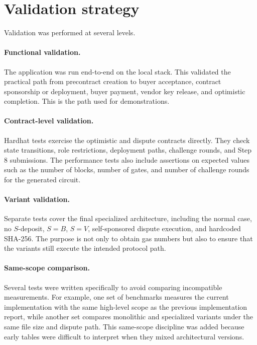 \section{Validation strategy}

Validation was performed at several levels.

\paragraph{Functional validation.}
The application was run end-to-end on the local stack. This validated the practical path from
precontract creation to buyer acceptance, contract sponsorship or deployment, buyer payment,
vendor key release, and optimistic completion. This is the path used for demonstrations.

\paragraph{Contract-level validation.}
Hardhat tests exercise the optimistic and dispute contracts directly. They check state
transitions, role restrictions, deployment paths, challenge rounds, and Step 8 submissions.
The performance tests also include assertions on expected values such as the number of
blocks, number of gates, and number of challenge rounds for the generated circuit.

\paragraph{Variant validation.}
Separate tests cover the final specialized architecture, including the normal case,
no \(S\)-deposit, \(S=B\), \(S=V\), self-sponsored dispute execution, and hardcoded
SHA-256. The purpose is not only to obtain gas numbers but also to ensure that the variants
still execute the intended protocol path.

\paragraph{Same-scope comparison.}
Several tests were written specifically to avoid comparing incompatible measurements. For
example, one set of benchmarks measures the current implementation with the same high-level
scope as the previous implementation report, while another set compares monolithic and
specialized variants under the same file size and dispute path. This same-scope discipline
was added because early tables were difficult to interpret when they mixed architectural
versions.

